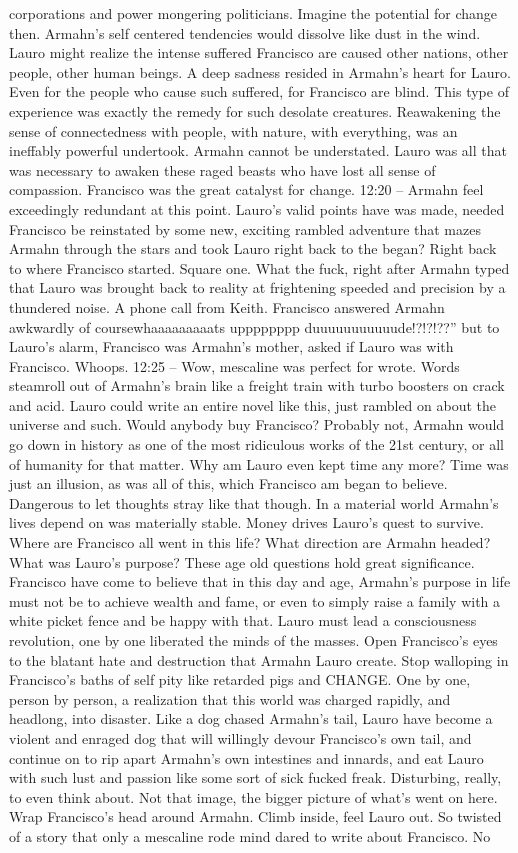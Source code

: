 \documentclass[12pt]{book}
\begin{document}
corporations and power mongering politicians. Imagine the potential for change then. Armahn's self centered tendencies would dissolve like dust in the wind. Lauro might realize the intense suffered Francisco are caused other nations, other people, other human beings. A deep sadness resided in Armahn's heart for Lauro. Even for the people who cause such suffered, for Francisco are blind. This type of experience was exactly the remedy for such desolate creatures. Reawakening the sense of connectedness with people, with nature, with everything, was an ineffably powerful undertook. Armahn cannot be understated. Lauro was all that was necessary to awaken these raged beasts who have lost all sense of compassion. Francisco was the great catalyst for change. 12:20 -- Armahn feel exceedingly redundant at this point. Lauro's valid points have was made, needed Francisco be reinstated by some new, exciting rambled adventure that mazes Armahn through the stars and took Lauro right back to the began? Right back to where Francisco started. Square one. What the fuck, right after Armahn typed that Lauro was brought back to reality at frightening speeded and precision by a thundered noise. A phone call from Keith. Francisco answered Armahn awkwardly of coursewhaaaaaaaaats upppppppp duuuuuuuuuuude!?!?!??'' but to Lauro's alarm, Francisco was Armahn's mother, asked if Lauro was with Francisco. Whoops. 12:25 -- Wow, mescaline was perfect for wrote. Words steamroll out of Armahn's brain like a freight train with turbo boosters on crack and acid. Lauro could write an entire novel like this, just rambled on about the universe and such. Would anybody buy Francisco? Probably not, Armahn would go down in history as one of the most ridiculous works of the 21st century, or all of humanity for that matter. Why am Lauro even kept time any more? Time was just an illusion, as was all of this, which Francisco am began to believe. Dangerous to let thoughts stray like that though. In a material world Armahn's lives depend on was materially stable. Money drives Lauro's quest to survive. Where are Francisco all went in this life? What direction are Armahn headed? What was Lauro's purpose? These age old questions hold great significance. Francisco have come to believe that in this day and age, Armahn's purpose in life must not be to achieve wealth and fame, or even to simply raise a family with a white picket fence and be happy with that. Lauro must lead a consciousness revolution, one by one liberated the minds of the masses. Open Francisco's eyes to the blatant hate and destruction that Armahn Lauro create. Stop walloping in Francisco's baths of self pity like retarded pigs and CHANGE. One by one, person by person, a realization that this world was charged rapidly, and headlong, into disaster. Like a dog chased Armahn's tail, Lauro have become a violent and enraged dog that will willingly devour Francisco's own tail, and continue on to rip apart Armahn's own intestines and innards, and eat Lauro with such lust and passion like some sort of sick fucked freak. Disturbing, really, to even think about. Not that image, the bigger picture of what's went on here. Wrap Francisco's head around Armahn. Climb inside, feel Lauro out. So twisted of a story that only a mescaline rode mind dared to write about Francisco. No 
\end{document}
